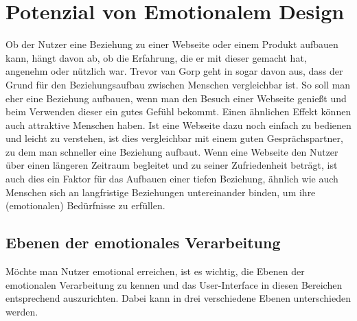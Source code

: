 \documentclass[./dokumentation.tex]{subfiles}
\begin{document}
\section{Potenzial von Emotionalem Design}
Ob der Nutzer eine Beziehung zu einer Webseite oder einem Produkt aufbauen kann, hängt davon ab, ob die Erfahrung, die er mit dieser gemacht hat, angenehm oder nützlich war. Trevor van Gorp geht in  \cite{vanGorp2013} sogar davon aus, dass der Grund für den Beziehungsaufbau zwischen Menschen vergleichbar ist. So soll man eher eine Beziehung aufbauen, wenn man den Besuch einer Webseite genießt und beim Verwenden dieser ein gutes Gefühl bekommt. Einen ähnlichen Effekt können auch attraktive Menschen haben. Ist eine Webseite dazu noch einfach zu bedienen und leicht zu verstehen, ist dies vergleichbar mit einem guten Gesprächspartner, zu dem man schneller eine Beziehung aufbaut. Wenn eine Webseite den Nutzer über einen längeren Zeitraum begleitet und zu seiner Zufriedenheit beträgt, ist auch dies ein Faktor für das Aufbauen einer tiefen Beziehung, ähnlich wie auch Menschen sich an langfristige Beziehungen untereinander binden, um ihre (emotionalen) Bedürfnisse zu erfüllen.  \cite{vanGorp2013}

\subsection{Ebenen der emotionales Verarbeitung}

Möchte man Nutzer emotional erreichen, ist es wichtig, die Ebenen der emotionalen Verarbeitung zu kennen und das User-Interface in diesen Bereichen entsprechend auszurichten. Dabei kann in drei verschiedene Ebenen unterschieden werden. 

\end{document}
